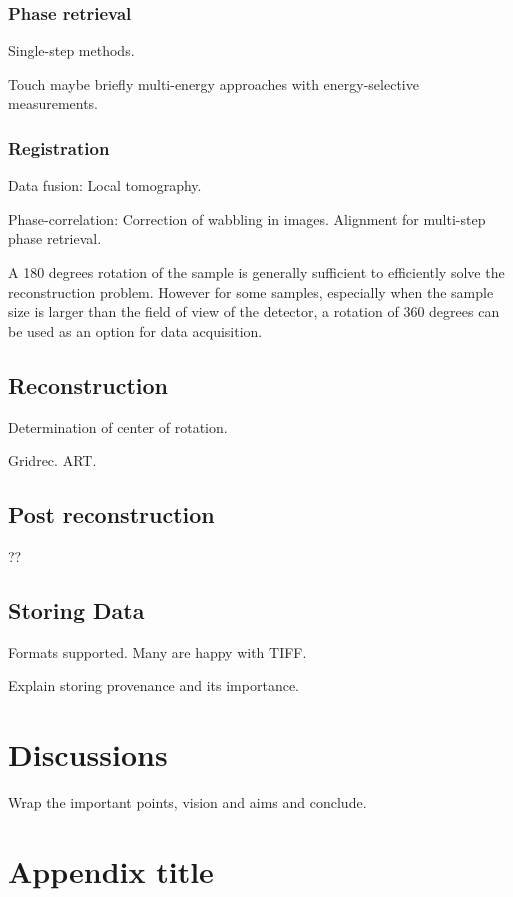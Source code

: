 \documentclass[pdf]{iucr}              %
\begin{document}
\subsubsection{Phase retrieval}

Single-step methods. 

Touch maybe briefly multi-energy approaches with energy-selective measurements.


\subsubsection{Registration}

Data fusion: Local tomography. 

Phase-correlation: Correction of wabbling in images. Alignment for multi-step phase retrieval.

A 180 degrees rotation of the sample is generally sufficient to efficiently solve the reconstruction problem. However for some samples, especially when the sample size is larger than the field of view of the detector, a  rotation of 360 degrees can be used as an option for data acquisition. 

\subsection{Reconstruction}

Determination of center of rotation.

Gridrec. ART. 

\subsection{Post reconstruction}

??

\subsection{Storing Data}

Formats supported. Many are happy with TIFF. 

Explain storing provenance and its importance.

\section{Discussions}

Wrap the important points, vision and aims and conclude.

\appendix
\section{Appendix title}
\end{document}
